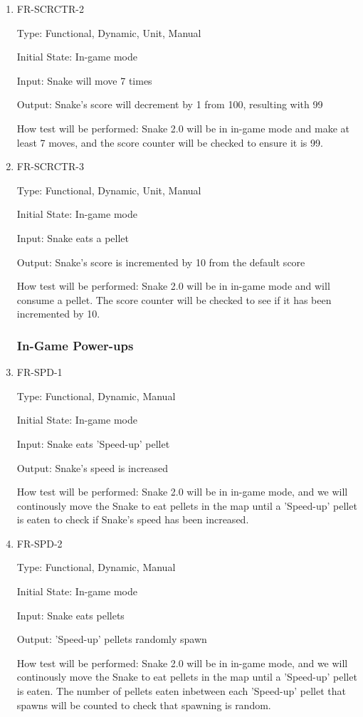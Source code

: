 \documentclass[12pt, titlepage]{article}
\begin{document}
\begin{enumerate}
\item{FR-SCRCTR-2}
\label{fr:scrctr-2}

Type: Functional, Dynamic, Unit, Manual

Initial State: In-game mode

Input: Snake will move 7 times

Output: Snake's score will decrement by 1 from 100, resulting with 99

How test will be performed: Snake 2.0 will be in in-game mode and make at least 7 moves, and the score counter will be checked to ensure it is 99.

\item{FR-SCRCTR-3}
\label{fr:scrctr-3}

Type: Functional, Dynamic, Unit, Manual

Initial State: In-game mode

Input: Snake eats a pellet

Output: Snake's score is incremented by 10 from the default score

How test will be performed: Snake 2.0 will be in in-game mode and will consume a pellet. The score counter will be checked to see if it has been incremented by 10.

\subsubsection{In-Game Power-ups}

\item{FR-SPD-1}
\label{fr:spd-1}

Type: Functional, Dynamic, Manual

Initial State: In-game mode

Input: Snake eats 'Speed-up' pellet

Output: Snake's speed is increased

How test will be performed: Snake 2.0 will be in in-game mode, and we will continously move the Snake to eat pellets in the map until a 'Speed-up' pellet is eaten to check if Snake's speed has  been increased.

\item{FR-SPD-2}
\label{fr:spd-2}

Type: Functional, Dynamic, Manual

Initial State: In-game mode

Input: Snake eats pellets

Output: 'Speed-up' pellets randomly spawn

How test will be performed: Snake 2.0 will be in in-game mode, and we will continously move the Snake to eat pellets in the map until a 'Speed-up' pellet is eaten. The number of pellets eaten inbetween each 'Speed-up' pellet that spawns will be counted to check that spawning is random.


\end{enumerate}
\end{document}
